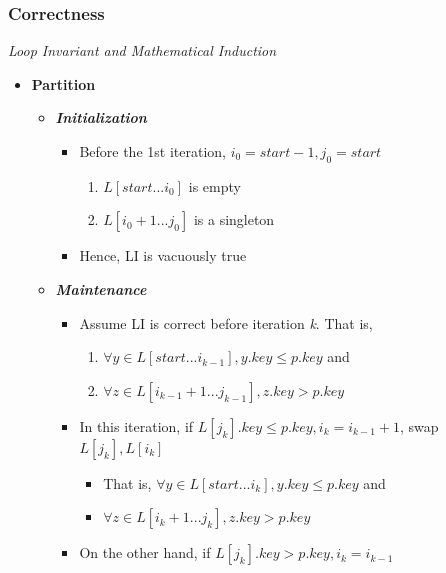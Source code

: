 \documentclass[10pt, 
a4paper, 
oneside, 
headinclude, footinclude, 
BCOR5mm]
{scrartcl}
\begin{document}
\subsubsection{Correctness}
\begin{definition}
    \textit{Loop Invariant and Mathematical Induction}
    \begin{itemize}
        \item \textbf{Partition}
        \begin{itemize}
            \item \textbf{\textit{Initialization}}
            \begin{itemize}
                \item Before the 1st iteration, $i_0=start-1,j_0=start$
                \begin{enumerate}
                    \item $L[start...i_0]$ is empty
                    \item $L[i_0+1...j_0]$ is a singleton
                \end{enumerate}
                \item Hence, LI is vacuously true
            \end{itemize}
            \item \textbf{\textit{Maintenance}}
            \begin{itemize}
                \item Assume LI is correct before iteration \textit{k}. That is,
                \begin{enumerate}
                    \item $\forall y\in L[start...i_{k-1}], y.key \leq p.key$ and
                    \item $\forall z\in L[i_{k-1}+1...j_{k-1}],z.key>p.key$ 
                \end{enumerate}
                \item In this iteration, if $L[j_k].key\leq p.key,i_k=i_{k-1}+1$, swap $L[j_k],L[i_k]$
                \begin{itemize}
                    \item That is, $\forall y\in L[start...i_{k}], y.key \leq p.key$ and
                    \item $\forall z\in L[i_{k}+1...j_{k}],z.key>p.key$ 
                \end{itemize}
                \item On the other hand, if $L[j_k].key>p.key,i_k=i_{k-1}$
                \begin{itemize}

\end{itemize}
\end{itemize}
\end{itemize}
\end{itemize}
\end{definition}
\end{document}
